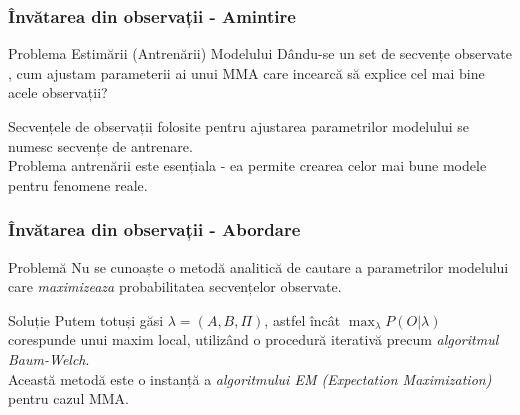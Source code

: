 \begin{frame}
	\frametitle{Învătarea din observații - Amintire}
	
	\begin{block}{Problema Estimării (Antrenării) Modelului}
		Dându-se un set de secvențe observate \visible<2->{\alert{$\mathcal{O} = [O_1 O_2 \cdots O_L]$}}, 
		cum ajustam \alert{parameterii} \visible<3->{\alert{$\lambda=(A,B,\Pi)$}} 
		ai unui MMA care incearcă să explice cel mai bine acele observații?
  	\end{block}	
  	\pause
  	
  	\begin{block}{}
		Secvențele de observații folosite pentru ajustarea parametrilor modelului se numesc secvențe 
		\alert{de antrenare}.\\
		Problema antrenării este esențiala - ea permite crearea celor mai bune modele pentru fenomene reale.
  	\end{block}
\end{frame}


\begin{frame}[t]
	\frametitle{Învătarea din observații - Abordare}
	\pause
		
	\begin{block}{\alert{Problemă}}
		Nu se cunoaște o metodă analitică de cautare a parametrilor modelului care \emph{maximizeaza} probabilitatea
		secvențelor observate.
  	\end{block}
  	\pause
  	
  	\begin{block}{Soluție}
  		Putem totuși găsi $\lambda = (A, B, \Pi)$, astfel încât $\max_{\lambda} P(O \vert \lambda)$ corespunde
  		unui \alert{maxim local}, utilizând o \alert{procedură iterativă} precum \emph{algoritmul Baum-Welch}.\\
  		Această metodă este o instanță a \emph{algoritmului EM (Expectation Maximization) \citep{dempster1977maximum}} 
  		pentru cazul MMA.
  	\end{block}
  	
\end{frame}

